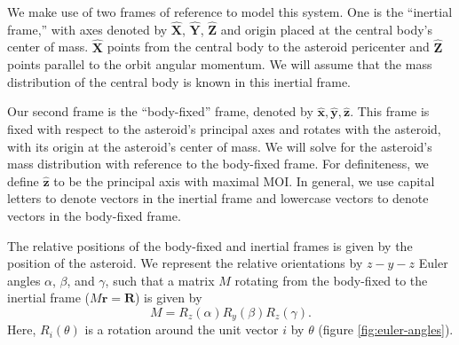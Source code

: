 \documentclass[fleqn,usenatbib]{mnras}
\newcommand{\unit}[1]{\bm{\hat{#1}}}
\begin{document}
We make use of two frames of reference to model this system. One is the ``inertial frame,'' with axes denoted by $\unit{X}$, $\unit{Y}$, $\unit{Z}$ and origin placed at the central body's center of mass. $\unit{X}$ points from the central body to the asteroid pericenter and $\unit{Z}$ points parallel to the orbit angular momentum. We will assume that the mass distribution of the central body is known in this inertial frame.

Our second frame is the ``body-fixed'' frame, denoted by $\unit{x}, \unit{y}, \unit{z}$. This frame is fixed with respect to the asteroid's principal axes and rotates with the asteroid, with its origin at the asteroid's center of mass. We will solve for the asteroid's mass distribution with reference to the body-fixed frame. For definiteness, we define $\unit{z}$ to be the principal axis with maximal MOI. In general, we use capital letters to denote vectors in the inertial frame and lowercase vectors to denote vectors in the body-fixed frame.

The relative positions of the body-fixed and inertial frames is given by the position of the asteroid. We represent the relative orientations by $z-y-z$ Euler angles $\alpha$, $\beta$, and $\gamma$, such that a matrix $M$ rotating from the body-fixed to the inertial frame ($M\bm{r} = \bm{R}$) is given by
\begin{equation}
M = R_z(\alpha) R_y(\beta) R_z(\gamma).
\label{eqn:euler-angles}
\end{equation}
Here, $R_i(\theta)$ is a rotation around the unit vector $i$ by $\theta$ (figure \ref{fig:euler-angles}).
\end{document}
